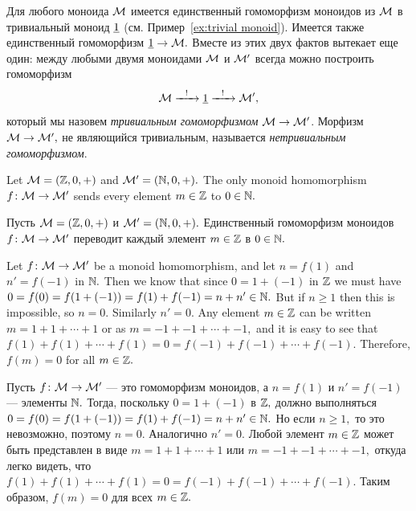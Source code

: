 \documentclass[../main/CT4S-EN-RU]{subfiles}
\begin{document}
\begin{exampleRUS}\label{ex:trivial monoid homomorphism}
Для любого моноида $\mathcal{M}$ имеется единственный гомоморфизм моноидов из $\mathcal{M}$ в тривиальный моноид $\underline{1}$ (см. Пример~\ref{ex:trivial monoid}). Имеется также единственный гомоморфизм $\underline{1}\rightarrow\mathcal{M}.$ Вместе из этих двух фактов вытекает еще один: между любыми двумя моноидами $\mathcal{M}$ и $\mathcal{M}'$ всегда можно построить гомоморфизм
$$\mathcal{M}\xrightarrow{\ \ !\ \ }\underline{1}\xrightarrow{\ \ !\ \ }\mathcal{M}',$$
который мы назовем {\em тривиальным гомоморфизмом $\mathcal{M}\rightarrow\mathcal{M}'$}. Морфизм $\mathcal{M}\rightarrow\mathcal{M}',$ не являющийся тривиальным, называется {\em нетривиальным гомоморфизмом}.
\end{exampleRUS}

\begin{propositionENG}\label{prop:int to nat trivial}
Let $\mathcal{M}=({\mathbb Z},0,+)$ and $\mathcal{M}'=({\mathbb N},0,+).$ The only monoid homomorphism $f\colon\mathcal{M}\rightarrow\mathcal{M}'$ sends every element $m\in{\mathbb Z}$ to $0\in{\mathbb N}.$
\end{propositionENG}

\begin{propositionRUS}\label{prop:int to nat trivial}
Пусть $\mathcal{M}=({\mathbb Z},0,+)$ и $\mathcal{M}'=({\mathbb N},0,+).$ Единственный гомоморфизм моноидов $f\colon\mathcal{M}\rightarrow\mathcal{M}'$ переводит каждый элемент $m\in{\mathbb Z}$ в $0\in{\mathbb N}.$
\end{propositionRUS}

\begin{proofENG}
Let $f\colon\mathcal{M}\rightarrow\mathcal{M}'$ be a monoid homomorphism, and let $n=f(1)$ and $n'=f(-1)$ in ${\mathbb N}.$ Then we know that since $0=1+(-1)$ in ${\mathbb Z}$ we must have $0=f(0)=f(1+(-1))=f(1)+f(-1)=n+n'\in{\mathbb N}.$ But if $n\geq 1$ then this is impossible, so $n=0.$ Similarly $n'=0.$ Any element $m\in{\mathbb Z}$ can be written $m=1+1+\cdots+1$ or as $m=-1+-1+\cdots+-1,$ and it is easy to see that $f(1)+f(1)+\cdots+f(1)=0=f(-1)+f(-1)+\cdots+f(-1).$ Therefore, $f(m)=0$ for all $m\in{\mathbb Z}.$
\end{proofENG}

\begin{proofRUS}
Пусть $f\colon\mathcal{M}\rightarrow\mathcal{M}'$ — это гомоморфизм моноидов, а $n=f(1)$ и $n'=f(-1)$ — элементы ${\mathbb N}.$ Тогда, поскольку $0=1+(-1)$ в ${\mathbb Z},$ должно выполняться $0=f(0)=f(1+(-1))=f(1)+f(-1)=n+n'\in{\mathbb N}.$ Но если $n\geq 1,$ то это невозможно, поэтому $n=0.$ Аналогично $n'=0.$ Любой элемент $m\in{\mathbb Z}$ может быть представлен в виде $m=1+1+\cdots+1$ или $m=-1+-1+\cdots+-1,$ откуда легко видеть, что $f(1)+f(1)+\cdots+f(1)=0=f(-1)+f(-1)+\cdots+f(-1).$ Таким образом, $f(m)=0$ для всех $m\in{\mathbb Z}.$
\end{proofRUS}
\end{document}
